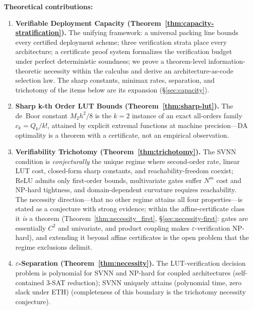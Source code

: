 \documentclass[journal,onecolumn]{IEEEtran}
\begin{document}
\vspace{4pt}
\noindent\textbf{Theoretical contributions:}

\begin{enumerate}[label=\arabic*.]
    \item \textbf{Verifiable Deployment Capacity
    (Theorem~\ref{thm:capacity-stratification}).} The unifying
    framework: a universal packing line bounds every certified
    deployment scheme; three verification strata place every
    architecture; a certificate proof system formalizes the
    verification budget under perfect deterministic soundness; we prove
    a theorem-level information-theoretic necessity within the calculus
    and derive an architecture-as-code selection law. The sharp
    constants, minimax rates, separation, and trichotomy of the items
    below are its expansion ({\S}\ref{sec:capacity}).

    \item \textbf{Sharp k-th Order LUT Bounds (Theorem~\ref{thm:sharp-lut}).}
   The de~Boor constant $M_2h^2/8$ is the $k=2$ instance of an exact
   all-orders family $c_k = Q_k/k!$, attained by explicit extremal
   functions at machine precision---DA optimality is a theorem with a
   certificate, not an empirical observation.

    \item \textbf{Verifiability Trichotomy (Theorem~\ref{thm:trichotomy}).}
   The SVNN condition is \emph{conjecturally} the unique regime where
   second-order rate, linear LUT cost, closed-form sharp constants, and
   reachability-freedom coexist; ReLU admits only first-order bounds,
   multivariate gates suffer $N^m$ cost and NP-hard tightness, and
   domain-dependent curvature requires reachability. The necessity
   direction---that no other regime attains all four properties---is
   stated as a conjecture with strong evidence; within the
   affine-certificate class it \emph{is} a theorem
   (Theorem~\ref{thm:necessity_first}, {\S}\ref{sec:necessity-first}:
   gates are essentially $C^2$ and univariate, and product coupling
   makes $\varepsilon$-verification NP-hard), and extending it beyond
   affine certificates is the open problem that the regime exclusions
   delimit.

    \item \textbf{$\varepsilon$-Separation (Theorem~\ref{thm:necessity}).}
   The LUT-verification decision problem is polynomial for SVNN and
   NP-hard for coupled architectures (self-contained 3-SAT reduction);
   SVNN uniquely attains (polynomial time, zero slack under ETH)
   (completeness of this boundary is the trichotomy necessity conjecture).


\end{enumerate}
\end{document}
